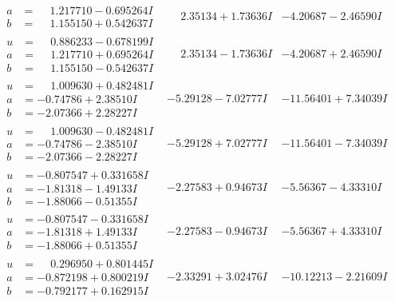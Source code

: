 \documentclass[1p]{elsarticle_modified}
\theoremstyle{definition}
\begin{document}
$$\begin{array}{c|c|c}
\begin{aligned}
a &= \phantom{-}1.217710 - 0.695264 I \\
b &= \phantom{-}1.155150 + 0.542637 I\end{aligned}
 & \phantom{-}2.35134 + 1.73636 I & -4.20687 - 2.46590 I \\ \hline\begin{aligned}
u &= \phantom{-}0.886233 - 0.678199 I \\
a &= \phantom{-}1.217710 + 0.695264 I \\
b &= \phantom{-}1.155150 - 0.542637 I\end{aligned}
 & \phantom{-}2.35134 - 1.73636 I & -4.20687 + 2.46590 I \\ \hline\begin{aligned}
u &= \phantom{-}1.009630 + 0.482481 I \\
a &= -0.74786 + 2.38510 I \\
b &= -2.07366 + 2.28227 I\end{aligned}
 & -5.29128 - 7.02777 I & -11.56401 + 7.34039 I \\ \hline\begin{aligned}
u &= \phantom{-}1.009630 - 0.482481 I \\
a &= -0.74786 - 2.38510 I \\
b &= -2.07366 - 2.28227 I\end{aligned}
 & -5.29128 + 7.02777 I & -11.56401 - 7.34039 I \\ \hline\begin{aligned}
u &= -0.807547 + 0.331658 I \\
a &= -1.81318 - 1.49133 I \\
b &= -1.88066 - 0.51355 I\end{aligned}
 & -2.27583 + 0.94673 I & -5.56367 - 4.33310 I \\ \hline\begin{aligned}
u &= -0.807547 - 0.331658 I \\
a &= -1.81318 + 1.49133 I \\
b &= -1.88066 + 0.51355 I\end{aligned}
 & -2.27583 - 0.94673 I & -5.56367 + 4.33310 I \\ \hline\begin{aligned}
u &= \phantom{-}0.296950 + 0.801445 I \\
a &= -0.872198 + 0.800219 I \\
b &= -0.792177 + 0.162915 I\end{aligned}
 & -2.33291 + 3.02476 I & -10.12213 - 2.21609 I \\ \hline\begin{aligned}

\end{aligned}
\end{array}$$
\end{document}
